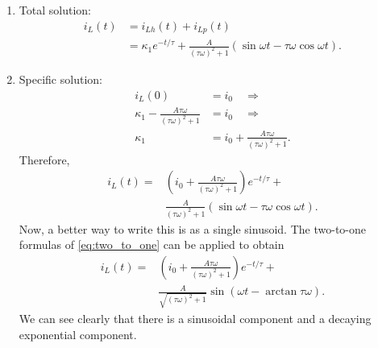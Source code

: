 \documentclass[electronics.tex]{subfiles}
\begin{document}
{\begin{enumerate}
\begin{enumerate}
\begin{enumerate}
\begin{equation*}
\begin{aligned}[c]
							\text{and}\vphantom{\frac{1}{1}}
						\end{aligned}
						\quad
						\begin{aligned}[c]
							-\tau\omega k_2 + k_1 = A& \quad \Rightarrow\\
							(\tau\omega)^2 k_1 + k_1 = A& \quad \Rightarrow\\
							k_2 = -\frac{A\tau\omega}{(\tau\omega)^2+1}&
						\end{aligned}
					\end{equation*}
					Success! So we have
					\begin{align*}
						i_{Lp}(t) = \frac{A}{(\tau\omega)^2+1} \left( 
							\sin\omega t - \tau\omega \cos\omega t
						\right).
					\end{align*}
					\item Total solution: 
					\begin{align*}
						i_L(t) &= i_{Lh}(t) + i_{Lp}(t) \\
						&= \kappa_1 e^{-t/\tau} +
						\frac{A}{(\tau\omega)^2+1} \left( 
							\sin\omega t - \tau\omega \cos\omega t
						\right).
					\end{align*}
					\item Specific solution:
					\begin{align*}
						i_L(0) &= i_0 \quad \Rightarrow \\
						\kappa_1 - 
						\frac{A \tau\omega}{(\tau\omega)^2+1} &= i_0 \quad \Rightarrow \\
						\kappa_1 &= i_0 +
						\frac{A \tau\omega}{(\tau\omega)^2+1}.
					\end{align*}
					Therefore,
					\begin{align*}
						i_L(t) =
						&\left(
							i_0 +
							\frac{A \tau\omega}{(\tau\omega)^2+1}
						\right)
						e^{-t/\tau} + \\
						&\frac{A}{(\tau\omega)^2+1} 
						\left( 
							\sin\omega t - \tau\omega \cos\omega t
						\right).
					\end{align*}
					Now, a better way to write this is as a single sinusoid. The two-to-one formulas of \autoref{eq:two_to_one} can be applied to obtain
					\begin{align*}
						i_L(t) =
						&\left(
							i_0 +
							\frac{A \tau\omega}{(\tau\omega)^2+1}
						\right)
						e^{-t/\tau} + \\
						&\frac{A}{\sqrt{(\tau\omega)^2+1}}  
							\sin(\omega t - \arctan \tau\omega).
					\end{align*}
					We can see clearly that there is a sinusoidal component and a decaying exponential component.

\end{enumerate}
\end{enumerate}
\end{enumerate}}
\end{document}
